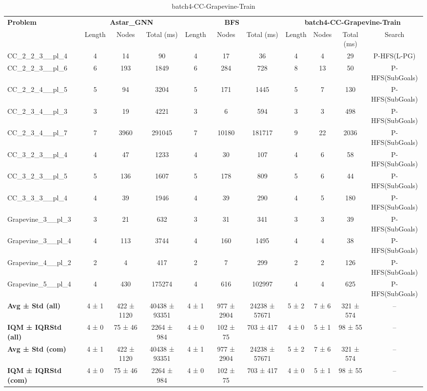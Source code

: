 \begin{table}[!ht]
\centering
\scriptsize
\begin{tabular}{l|ccc|ccc|cccc}
\multirow{2}{*}{\textbf{Problem}} & \multicolumn{3}{c|}{\textbf{Astar\_GNN}} & \multicolumn{3}{c|}{\textbf{BFS}} & \multicolumn{4}{c}{\textbf{batch4-CC-Grapevine-Train}} \\
\cline{2-11}
& Length & Nodes & Total (ms) & Length & Nodes & Total (ms) & Length & Nodes & Total (ms) & Search \\
\hline
CC\_2\_2\_3\_\_pl\_4 & 4 & 14 & 90 & 4 & 17 & 36 & 4 & 4 & 29 & P-HFS(L-PG) \\
CC\_2\_2\_3\_\_pl\_6 & 6 & 193 & 1849 & 6 & 284 & 728 & 8 & 13 & 50 & P-HFS(SubGoals) \\
CC\_2\_2\_4\_\_pl\_5 & 5 & 94 & 3204 & 5 & 171 & 1445 & 5 & 7 & 130 & P-HFS(SubGoals) \\
CC\_2\_3\_4\_\_pl\_3 & 3 & 19 & 4221 & 3 & 6 & 594 & 3 & 3 & 498 & P-HFS(SubGoals) \\
CC\_2\_3\_4\_\_pl\_7 & 7 & 3960 & 291045 & 7 & 10180 & 181717 & 9 & 22 & 2036 & P-HFS(SubGoals) \\
CC\_3\_2\_3\_\_pl\_4 & 4 & 47 & 1233 & 4 & 30 & 107 & 4 & 6 & 58 & P-HFS(SubGoals) \\
CC\_3\_2\_3\_\_pl\_5 & 5 & 136 & 1607 & 5 & 178 & 809 & 5 & 6 & 44 & P-HFS(SubGoals) \\
CC\_3\_3\_3\_\_pl\_4 & 4 & 39 & 1946 & 4 & 39 & 290 & 4 & 5 & 180 & P-HFS(SubGoals) \\
Grapevine\_3\_\_pl\_3 & 3 & 21 & 632 & 3 & 31 & 341 & 3 & 3 & 39 & P-HFS(SubGoals) \\
Grapevine\_3\_\_pl\_4 & 4 & 113 & 3744 & 4 & 160 & 1495 & 4 & 4 & 38 & P-HFS(SubGoals) \\
Grapevine\_4\_\_pl\_2 & 2 & 4 & 417 & 2 & 7 & 299 & 2 & 2 & 126 & P-HFS(SubGoals) \\
Grapevine\_5\_\_pl\_4 & 4 & 430 & 175274 & 4 & 616 & 102997 & 4 & 4 & 625 & P-HFS(SubGoals) \\
\hline
\textbf{Avg ± Std (all)} & 4 ± 1 & 422 ± 1120 & 40438 ± 93351 & 4 ± 1 & 977 ± 2904 & 24238 ± 57671 & 5 ± 2 & 7 ± 6 & 321 ± 574 & -- \\
\textbf{IQM ± IQRStd (all)} & 4 ± 0 & 75 ± 46 & 2264 ± 984 & 4 ± 0 & 102 ± 75 & 703 ± 417 & 4 ± 0 & 5 ± 1 & 98 ± 55 & -- \\
\textbf{Avg ± Std (com)} & 4 ± 1 & 422 ± 1120 & 40438 ± 93351 & 4 ± 1 & 977 ± 2904 & 24238 ± 57671 & 5 ± 2 & 7 ± 6 & 321 ± 574 & -- \\
\textbf{IQM ± IQRStd (com)} & 4 ± 0 & 75 ± 46 & 2264 ± 984 & 4 ± 0 & 102 ± 75 & 703 ± 417 & 4 ± 0 & 5 ± 1 & 98 ± 55 & -- \\
\end{tabular}
\caption{batch4-CC-Grapevine-Train}
\label{tab:batch4_CC-Grapevine_comparison_train}
\end{table}

